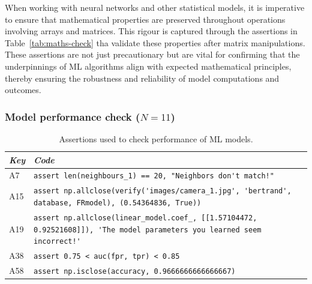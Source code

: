When working with neural networks and other statistical models, it is imperative to ensure that mathematical properties are preserved throughout operations involving arrays and matrices. This rigour is captured through the assertions in Table~\ref{tab:maths-check} tha validate these properties after matrix manipulations. These assertions are not just precautionary but are vital for confirming that the underpinnings of ML algorithms align with expected mathematical principles, thereby ensuring the robustness and reliability of model computations and outcomes.


\subsubsection{Model performance check ($N = 11$)}\label{sec:assert-model-perf}

\begin{table}
  \centering
  \caption{Assertions used to check performance of ML models.}
  \begin{tabular}{@{}m{} m{}@{}}
    \toprule
    \emph{\textbf{Key}}&
    \emph{\textbf{Code}}\\
    \midrule

    A7 &
    \lstinline[]$assert len(neighbours_1) == 20, "Neighbors don't match!"$\\

    A15 &
    \lstinline[]$assert np.allclose(verify('images/camera_1.jpg', 'bertrand', database, FRmodel), (0.54364836, True))$\\

    A19 &
    \lstinline[]$assert np.allclose(linear_model.coef_, [[1.57104472, 0.92521608]]), 'The model parameters you learned seem incorrect!'$\\

    A38 &
    \lstinline[]$assert 0.75 < auc(fpr, tpr) < 0.85$\\

    A58 &
    \lstinline[]$assert np.isclose(accuracy, 0.9666666666666667)$\\
    \bottomrule
  \end{tabular}
  \label{tab:model-perf-explicit}
\end{table}


